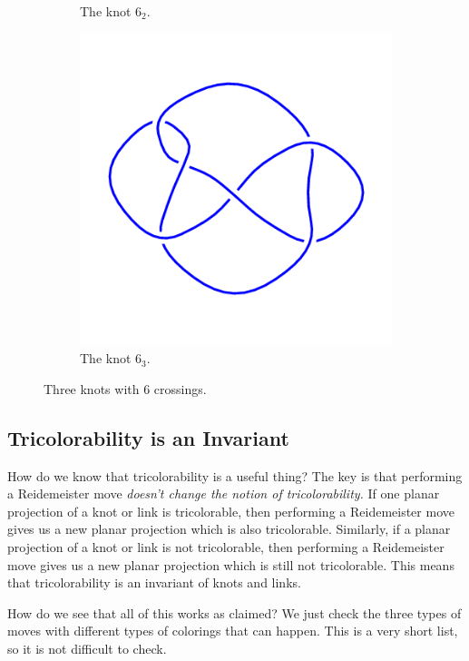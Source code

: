 \documentclass[12pt,letterpaper]{article}
\theoremstyle{definition}
\begin{document}
\begin{figure}[h]
\begin{subfigure}{.3\textwidth}
        \caption{The knot $6_2$.}
    \end{subfigure}
    \quad
    \begin{subfigure}{.3\textwidth}
        \centering
        \includegraphics[width=\textwidth]{rgp08pics/6_3.png}
        \caption{The knot $6_3$.}
    \end{subfigure}
\caption{Three knots with 6 crossings.}
\end{figure}

\subsection*{Tricolorability is an Invariant}

How do we know that tricolorability is a useful thing?
The key is that performing a Reidemeister move \emph{doesn't change the notion of tricolorability.}
If one planar projection of a knot or link is tricolorable, then performing a Reidemeister move gives us a new planar projection which is also tricolorable.
Similarly, if a planar projection of a knot or link is not tricolorable, then performing a Reidemeister move gives us a new planar projection which is still not tricolorable.
This means that tricolorability is an invariant of knots and links.

How do we see that all of this works as claimed?
We just check the three types of moves with different types of colorings that can happen.
This is a very short list, so it is not difficult to check.
\end{document}
